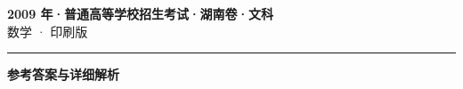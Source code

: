 \documentclass[zihao=5, a4paper]{ctexart}
\begin{document}
\begin{center}
  {\Large\bfseries 2009 年·普通高等学校招生考试·湖南卷·文科}\\[4pt]
  {\large 数学 · 印刷版}
\end{center}
\medskip
{}

\par\bigskip\hrule\bigskip
{}
\begin{center}{\large\bfseries 参考答案与详细解析}\end{center}
\smallskip

\end{document}
